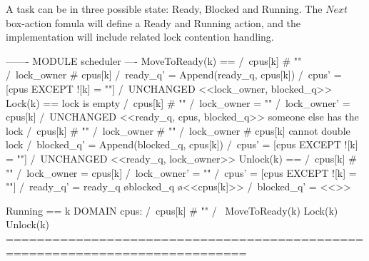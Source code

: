\documentclass{report}
\begin{document}
A task can be in three possible state: Ready, Blocked and Running. The $Next$
box-action fomula will define a Ready and Running action, and the implementation
will include related lock contention handling.\newline

\begin{tla}
------- MODULE scheduler ---- 
MoveToReady(k) == 
    /\ cpus[k] # "" 
    /\ lock_owner # cpus[k]
    /\ ready_q' = Append(ready_q, cpus[k]) 
    /\ cpus' = [cpus EXCEPT ![k] = ""]
    /\ UNCHANGED <<lock_owner, blocked_q>>
Lock(k) == 
    \* lock is empty
    \/  /\ cpus[k] # "" 
        /\ lock_owner = ""
        /\ lock_owner' = cpus[k]
        /\ UNCHANGED <<ready_q, cpus, blocked_q>>
    \* someone else has the lock
    \/  /\ cpus[k] # "" 
        /\ lock_owner # ""
        /\ lock_owner # cpus[k] \* cannot double lock
        /\ blocked_q' = Append(blocked_q, cpus[k])
        /\ cpus' = [cpus EXCEPT ![k] = ""]
        /\ UNCHANGED <<ready_q, lock_owner>>
Unlock(k) == 
    /\ cpus[k] # "" 
    /\ lock_owner = cpus[k]
    /\ lock_owner' = ""
    /\ cpus' = [cpus EXCEPT ![k] = ""]
    /\ ready_q' = ready_q \o blocked_q \o <<cpus[k]>>
    /\ blocked_q' = <<>>

Running == 
    \E k \in DOMAIN cpus:
        /\ cpus[k] # "" 
        /\ \/ MoveToReady(k)
           \/ Lock(k)
           \/ Unlock(k)
=============================================================================
\end{tla}
\end{document}
